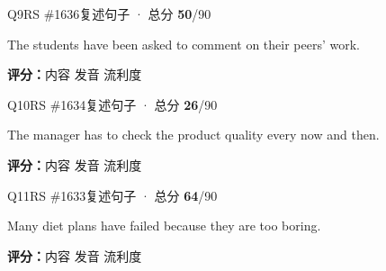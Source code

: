 \begin{qblock}{Q9\quad RS \#1636}{复述句子 · 总分 \textcolor{cAccent}{\bfseries 50}/90}
\begin{promptbox}
The students have been asked to comment on their peers' work.
\end{promptbox}
\asrlegend
\begin{asrbox}
          
\end{asrbox}
\smallskip
{\small\textbf{评分：}内容  \quad\textperiodcentered\quad 发音  \quad\textperiodcentered\quad 流利度 }
\end{qblock}

\begin{qblock}{Q10\quad RS \#1634}{复述句子 · 总分 \textcolor{cAccent}{\bfseries 26}/90}
\begin{promptbox}
The manager has to check the product quality every now and then.
\end{promptbox}
\asrlegend
\begin{asrbox}
           
\end{asrbox}
\smallskip
{\small\textbf{评分：}内容  \quad\textperiodcentered\quad 发音  \quad\textperiodcentered\quad 流利度 }
\end{qblock}

\begin{qblock}{Q11\quad RS \#1633}{复述句子 · 总分 \textcolor{cAccent}{\bfseries 64}/90}
\begin{promptbox}
Many diet plans have failed because they are too boring.
\end{promptbox}
\asrlegend
\begin{asrbox}
         
\end{asrbox}
\smallskip
{\small\textbf{评分：}内容  \quad\textperiodcentered\quad 发音  \quad\textperiodcentered\quad 流利度 }
\end{qblock}


